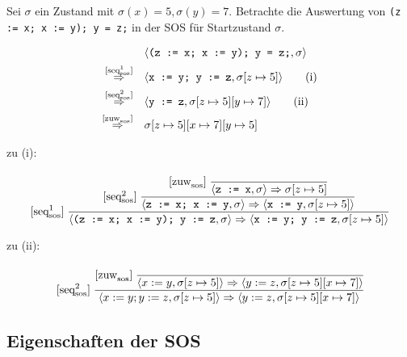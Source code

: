 \begin{example}
    Sei $\sigma$ ein Zustand mit $\sigma(x) = 5, \sigma(y) = 7$. Betrachte die Auswertung von \texttt{(z := x; x := y); y = z;} in der SOS für Startzustand $\sigma$.

    \begin{align*}
        & \langle \texttt{(z := x; x := y); y = z;}, \sigma \rangle \\
        \overset{\infruleSos[1]{seq}}{\Rightarrow} \quad & \langle \texttt{x := y; y := z}, \sigma[z \mapsto 5] \rangle \tag{i} \\
        \overset{\infruleSos[2]{seq}}{\Rightarrow} \quad & \langle \texttt{y := z}, \sigma[z \mapsto 5][y \mapsto 7] \rangle \tag{ii} \\
        \overset{\infruleSos{zuw}}{\Rightarrow} \quad & \sigma[z \mapsto 5][x \mapsto 7][y \mapsto 5]
    \end{align*}

    zu (i):
    \begin{align*}
        \infruleSos[1]{seq}\; \cfrac{
            \infruleSos[2]{seq}\; \cfrac{
                \infruleSos{zuw}\; \cfrac{}{
                    \stranssos{\texttt{z := x}}{\sigma}{\sigma[z \mapsto 5]}
                }
            }{
                \stranssos{\texttt{z := x; x := y}}{\sigma}{\langle \texttt{x := y}, \sigma[z \mapsto 5] \rangle}
            }
        }{
            \stranssos{\texttt{(z := x; x := y); y := z}}{\sigma}{\langle \texttt{x := y; y := z}, \sigma[z \mapsto 5] \rangle}
        }
    \end{align*}

    zu (ii):
    \begin{align*}
        \infruleSos[2]{seq}\; \cfrac{
            \infruleSos{zuw}\; \cfrac{}{
                \stranssos{x :=y}{\sigma[z \mapsto 5]}{\langle y :=z, \sigma[z \mapsto5][x \mapsto 7] \rangle}
            }
        }{
            \stranssos{x :=y; y :=z}{\sigma[z \mapsto 5]}{\langle y :=z, \sigma[z \mapsto5][x \mapsto 7] \rangle}
        }
    \end{align*}
\end{example}



\subsection{Eigenschaften der SOS}

